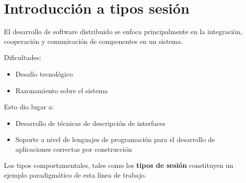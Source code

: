 \section{Introducción a tipos sesión}

\begin{frame}{\insertsection}

	El desarrollo de software distribuido se enfoca principalmente en la
	integración, cooperación y comunicación de componentes en un sistema.

	\bigskip

	Dificultades:
	\begin{itemize}
		\item{Desafío tecnológico}
		\item{Razonamiento sobre el sistema}
	\end{itemize}

\end{frame}


\begin{frame}{\insertsection}

	Esto dio lugar a:

	\begin{itemize}
		\item Desarrollo de técnicas de descripción de interfaces
		\item Soporte a nivel de lenguajes de programación para el desarrollo de aplicaciones correctas por construcción
	\end{itemize}

	\pause

	Los tipos comportamentales, tales como los \textbf{tipos de sesión} constituyen
	un ejemplo paradigmático de esta línea de trabajo.
\end{frame}

